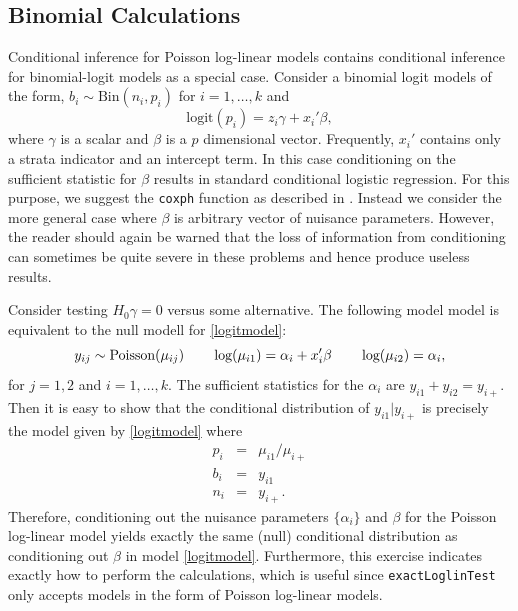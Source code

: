\documentclass[a4paper]{article}
\begin{document}
\subsection{Binomial Calculations}
\label{sec:binom}
Conditional inference for Poisson log-linear models contains
conditional inference for binomial-logit models as a special
case. Consider a binomial logit models of the form, $b_i \sim
\mbox{Bin}(n_i,p_i)$ for $i=1,\ldots,k$ and
\begin{equation}
\label{logitmodel}
 \mbox{logit}(p_{i}) = z_i \gamma + x_i' \beta,
\end{equation}
where $\gamma$ is a scalar and $\beta$ is a $p$ dimensional vector.
Frequently, $x_i'$ contains only a strata indicator and an intercept
term. In this case conditioning on the sufficient statistic for
$\beta$ results in standard conditional logistic regression. For this
purpose, we suggest the \texttt{coxph} function as described in
\cite{vr:2002}. Instead we consider the more general case where
$\beta$ is arbitrary vector of nuisance parameters.  However, the
reader should again be warned that the loss of information from
conditioning can sometimes be quite severe in these problems and hence
produce useless results.


Consider testing $H_0 \gamma = 0$ versus some alternative.
The following model model is equivalent to the null modell for
\eqref{logitmodel}:
\begin{equation}
\label{eq:poisson}
y_{ij} \sim \mbox{Poisson}(\mu_{ij}) 
\hspace{.3in} 
\mbox{log}(\mu_{i1}) = \alpha_i + x_i' \beta
\hspace{.3in} 
\mbox{log}(\mu_{i2}) = \alpha_i,
\end{equation}
for $j=1,2$ and $i=1,\ldots,k$.  The sufficient statistics for the
$\alpha_i$ are $y_{i1} + y_{i2} = y_{i+}$. Then it is easy to show
that the conditional distribution of $y_{i1} | y_{i+}$ is precisely
the model given by \eqref{logitmodel} where
\begin{eqnarray*}
  p_i & = &\mu_{i1} / \mu_{i+} \\
  b_i & = & y_{i1} \\
  n_i & = & y_{i+}.
\end{eqnarray*}
Therefore, conditioning out the nuisance parameters $\{\alpha_i\}$ and
$\beta$ for the Poisson log-linear model yields exactly the same
(null) conditional distribution as conditioning out $\beta$ in model
\eqref{logitmodel}.  Furthermore, this exercise indicates exactly how
to perform the calculations, which is useful since \texttt{exactLoglinTest} only
accepts models in the form of Poisson log-linear models.
\end{document}
